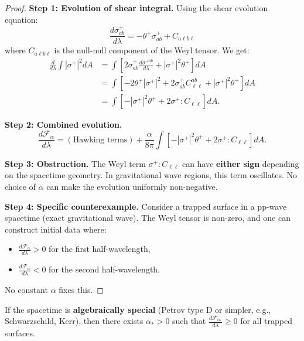 \begin{proof}
\textbf{Step 1: Evolution of shear integral.}
Using the shear evolution equation:
\begin{equation}
    \frac{d\sigma^+_{ab}}{d\lambda} = -\theta^+\sigma^+_{ab} + C_{a\ell b\ell}
\end{equation}
where $C_{a\ell b\ell}$ is the null-null component of the Weyl tensor. We get:
\begin{align}
    \frac{d}{d\lambda}\int |\sigma^+|^2 dA &= \int \left[2\sigma^+_{ab}\frac{d\sigma^{+ab}}{d\lambda} + |\sigma^+|^2 \theta^+\right] dA \\
    &= \int \left[-2\theta^+|\sigma^+|^2 + 2\sigma^+_{ab}C^{ab}_{\ell\ell} + |\sigma^+|^2\theta^+\right] dA \\
    &= \int \left[-|\sigma^+|^2\theta^+ + 2\sigma^+ : C_{\ell\ell}\right] dA.
\end{align}

\textbf{Step 2: Combined evolution.}
\begin{equation}
    \frac{d\mathcal{F}_\alpha}{d\lambda} = (\text{Hawking terms}) + \frac{\alpha}{8\pi}\int\left[-|\sigma^+|^2\theta^+ + 2\sigma^+ : C_{\ell\ell}\right] dA.
\end{equation}

\textbf{Step 3: Obstruction.}
The Weyl term $\sigma^+ : C_{\ell\ell}$ can have \textbf{either sign} depending on the spacetime geometry. In gravitational wave regions, this term oscillates. No choice of $\alpha$ can make the evolution uniformly non-negative.

\textbf{Step 4: Specific counterexample.}
Consider a trapped surface in a pp-wave spacetime (exact gravitational wave). The Weyl tensor is non-zero, and one can construct initial data where:
\begin{itemize}
    \item $\frac{d\mathcal{F}_\alpha}{d\lambda} > 0$ for the first half-wavelength,
    \item $\frac{d\mathcal{F}_\alpha}{d\lambda} < 0$ for the second half-wavelength.
\end{itemize}
No constant $\alpha$ fixes this.
\end{proof}

\begin{theorem}\label{thm:alphaconditional}
If the spacetime is \textbf{algebraically special} (Petrov type D or simpler, e.g., Schwarzschild, Kerr), then there exists $\alpha_* > 0$ such that $\frac{d\mathcal{F}_{\alpha_*}}{d\lambda} \geq 0$ for all trapped surfaces.
\end{theorem}

